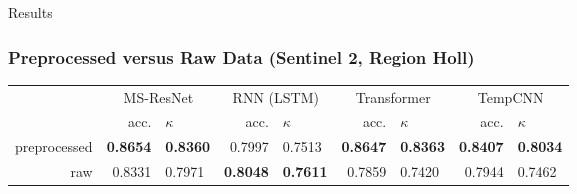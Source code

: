 
{
	\begin{frame}[plain]
	\vfill
	\begin{center}
		\Huge\color{tumwhite}
		Results
	\end{center}
	\vfill
\end{frame}
}

\begin{frame}
	\frametitle{Preprocessed versus Raw Data (Sentinel 2, Region Holl)}
	
	\begin{tabular}{rrlrlrlrl}
		\toprule
		 & \multicolumn{2}{c}{MS-ResNet} & \multicolumn{2}{c}{RNN (LSTM)} & \multicolumn{2}{c}{Transformer} & \multicolumn{2}{c}{TempCNN} \\
		 & acc. & $\kappa$ & acc. & $\kappa$ & acc. & $\kappa$ & acc. & $\kappa$ \\
		\cmidrule(lr){2-3}\cmidrule(lr){4-5} \cmidrule(lr){6-7}\cmidrule(lr){8-9}
		preprocessed & \textbf{0.8654} & \textbf{0.8360} & 0.7997 & 0.7513 & \textbf{0.8647} & \textbf{0.8363} & \textbf{0.8407} & \textbf{0.8034} \\
		raw 		 & 0.8331 & 0.7971 & \textbf{0.8048} & \textbf{0.7611} & 0.7859 & 0.7420 & 0.7944 & 0.7462 \\
		\bottomrule
	\end{tabular}
	
	
\end{frame}


